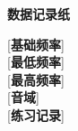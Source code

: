 \clearpage

\begin{center}
 \textbf{数据记录纸}
\end{center}

[\textbf{基础频率}] \\

[\textbf{最低频率}] \\

[\textbf{最高频率}] \\

[\textbf{音域}] \\

[\textbf{练习记录}]\\
